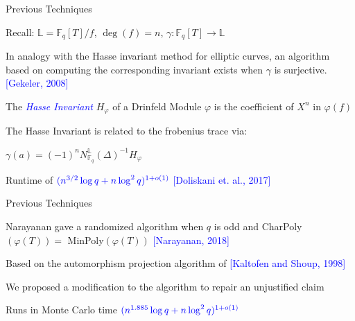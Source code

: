 \documentclass{beamer}
\newcommand{\blue}{\textcolor{blue}}
\newcommand{\spa}{\vspace{0.2cm}}
\newcommand{\spa}{\textnormal{ }}
\begin{document}
\begin{frame}{Previous Techniques}


Recall: $\mathbb{L} = \mathbb{F}_q[T]/f$, $\deg(f) = n$, $\gamma: \mathbb{F}_q[T] \to \mathbb{L}$

\spa

In analogy with the Hasse invariant method for elliptic curves, an algorithm based on computing the corresponding invariant exists when $\gamma$ is surjective. \blue{[Gekeler, 2008]}





\begin{definition}
    The \blue{\textit{Hasse Invariant}} $H_{\varphi}$ of a Drinfeld Module $\varphi$ is the coefficient of $X^n$ in $\varphi(f)$
\end{definition}

\spa

The Hasse Invariant is related to the frobenius trace via:
\vspace{0.2cm}

\centerline{$\gamma(a) = (-1)^n N_{\mathbb{F}_q}^{\mathbb{L}}(\Delta)^{-1}H_{\varphi}$ }

\spa

Runtime of $\blue{(n^{3/2} \log q + n \log^2 q)^{1+o(1)}}$ \blue{[Doliskani et. al., 2017]}








\end{frame}


\begin{frame}{Previous Techniques}

Narayanan gave a randomized algorithm when $q$ is odd and  CharPoly$(\varphi(T)) = $ MinPoly$(\varphi(T))$ \blue{[Narayanan, 2018]}

\spa

Based on the automorphism projection algorithm of \blue{[Kaltofen and Shoup, 1998]}

\spa

We proposed a modification to the algorithm to repair an unjustified claim

\spa

Runs in Monte Carlo time $\blue{(n^{1.885} \log q + n \log^2 q)^{1+o(1)}}$
    
\end{frame}
\end{document}
